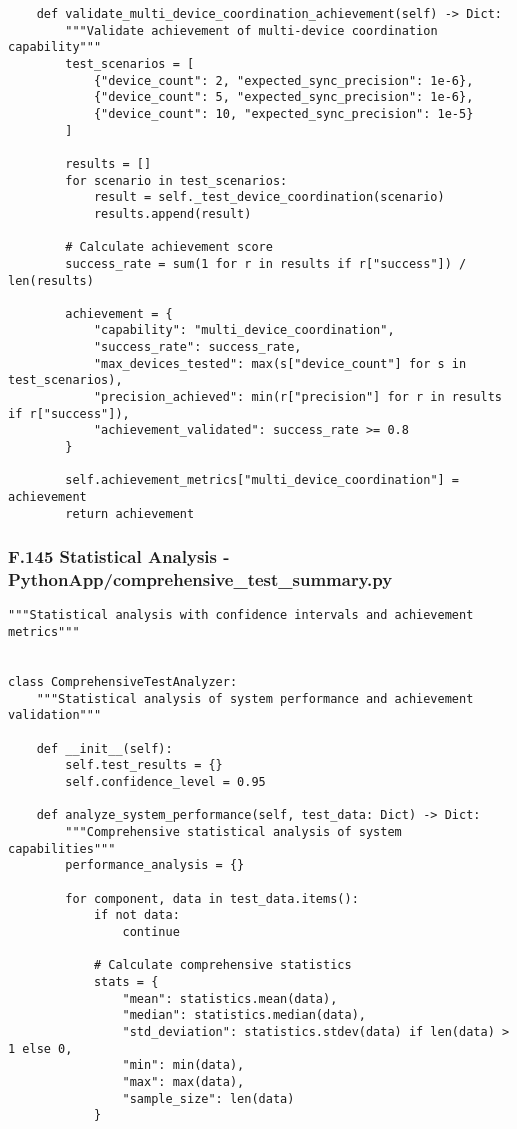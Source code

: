 \documentclass[12pt,a4paper]{report}
\begin{document}
{{\begin{verbatim}
    def validate_multi_device_coordination_achievement(self) -> Dict:
        """Validate achievement of multi-device coordination capability"""
        test_scenarios = [
            {"device_count": 2, "expected_sync_precision": 1e-6},
            {"device_count": 5, "expected_sync_precision": 1e-6},
            {"device_count": 10, "expected_sync_precision": 1e-5}
        ]

        results = []
        for scenario in test_scenarios:
            result = self._test_device_coordination(scenario)
            results.append(result)

        # Calculate achievement score
        success_rate = sum(1 for r in results if r["success"]) / len(results)

        achievement = {
            "capability": "multi_device_coordination",
            "success_rate": success_rate,
            "max_devices_tested": max(s["device_count"] for s in test_scenarios),
            "precision_achieved": min(r["precision"] for r in results if r["success"]),
            "achievement_validated": success_rate >= 0.8
        }

        self.achievement_metrics["multi_device_coordination"] = achievement
        return achievement
\end{verbatim}

\subsubsection{F.145 Statistical Analysis - PythonApp/comprehensive_test_summary.py}

\begin{verbatim}
"""Statistical analysis with confidence intervals and achievement metrics"""


class ComprehensiveTestAnalyzer:
    """Statistical analysis of system performance and achievement validation"""

    def __init__(self):
        self.test_results = {}
        self.confidence_level = 0.95

    def analyze_system_performance(self, test_data: Dict) -> Dict:
        """Comprehensive statistical analysis of system capabilities"""
        performance_analysis = {}

        for component, data in test_data.items():
            if not data:
                continue

            # Calculate comprehensive statistics
            stats = {
                "mean": statistics.mean(data),
                "median": statistics.median(data),
                "std_deviation": statistics.stdev(data) if len(data) > 1 else 0,
                "min": min(data),
                "max": max(data),
                "sample_size": len(data)
            }


\end{verbatim}}}
\end{document}
